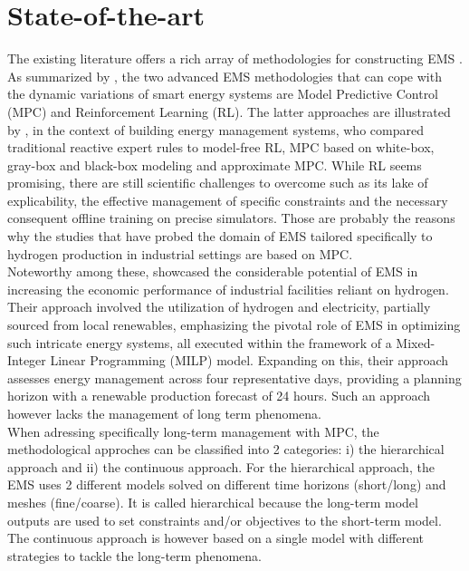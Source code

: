 \section{State-of-the-art}
The existing literature offers a rich array of methodologies for constructing EMS \citep{weitzel_energy_2018}. As summarized by \cite{alabi_strategic_2023}, the two advanced EMS methodologies that can cope with the dynamic variations of smart energy systems are Model Predictive Control (MPC) and Reinforcement Learning (RL). The latter approaches are illustrated by \cite{stoffel_evaluation_2023}, in the context of building energy management systems, who compared traditional reactive expert rules to model-free RL, MPC based on white-box, gray-box and black-box modeling and approximate MPC. While RL seems promising, there are still scientific challenges to overcome such as its lake of explicability, the effective management of specific constraints and the necessary consequent offline training on precise simulators. Those are probably the reasons why the studies that have probed the domain of EMS tailored specifically to hydrogen production in industrial settings are based on MPC.
\\
Noteworthy among these, \cite{klyapovskiy_optimal_2021} showcased the considerable potential of EMS in increasing the economic performance of industrial facilities reliant on hydrogen. Their approach involved the utilization of hydrogen and electricity, partially sourced from local renewables, emphasizing the pivotal role of EMS in optimizing such intricate energy systems, all executed within the framework of a Mixed-Integer Linear Programming (MILP) model. Expanding on this, their approach assesses energy management across four representative days, providing a planning horizon with a renewable production forecast of 24 hours. Such an approach however lacks the management of long term phenomena.
\\
When adressing specifically long-term management with MPC, the methodological approches can be classified into 2 categories: i) the hierarchical approach and ii) the continuous approach. For the hierarchical approach, the EMS uses 2 different models solved on different time horizons (short/long) and meshes (fine/coarse). It is called hierarchical because the long-term model outputs are used to set constraints and/or objectives to the short-term model. The continuous approach is however based on a single model with different strategies to tackle the long-term phenomena.\\

